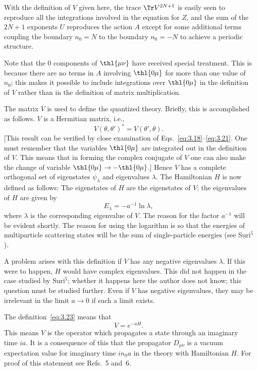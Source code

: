 With the definition of $V$ given here, the trace $\Tr V^{2N+1}$ is easily
seen to reproduce all the integrations involved in the equation for $Z$,
and the sum of the $2N+1$ exponents $U$ reproduces the action $A$ except
for some additional terms coupling the boundary $n_{0}=N$ to the
boundary $n_{0}=-N$ to achieve a periodic structure.

Note that the 0 components of $\thl{\mu\nu}$ have received special
treatment.  This is because there are no terms in $A$ involving
$\thl{0\mu}$ for more than one value of $n_{0}$; this makes it possible
to include integrations over $\thl{0\mu}$ in the definition of $V$
rather than in the definition of matrix multiplication.

The matrix $V$ is used to define the quantized theory.  Briefly, this is
accomplished as follows.  $V$ is a Hermitian matrix, i.e.,
\begin{equation}
V(\theta,\theta')^{*} = V(\theta',\theta).
\label{eq:3.22}
\end{equation}
[This result can be verified by close examination of
Eqs.~\eqref{eq:3.18}--\eqref{eq:3.21}.  One must remember that the
variables $\thl{0\mu}$ are integrated out in the definition of $V$.  This
means that in forming the complex conjugate of $V$ one can also make the
change of variable $\thl{0\mu} \to -\thl{0\mu}$.]  Hence $V$ has a
complete orthogonal set of eigenstates $\psi_{\lambda}$ and eigenvalues
$\lambda$.  The Hamiltonian $H$ is now defined as follows:  The
eigenstates of $H$ are the eigenstates of $V$; the eigenvalues of $H$ are
given by
\begin{equation}
E_{\lambda} = -a^{-1}\ln\lambda,
\label{eq:3.23}
\end{equation}
where $\lambda$ is the corresponding eigenvalue of $V$.  The reason for
the factor $a^{-1}$ will be evident shortly.  The reason for using the
logarithm is so that the energies of multiparticle scattering states will
be the sum of single-particle energies (see Suri${}^{5}$).

A problem arises with this definition if $V$ has any negative eigenvalues
$\lambda$.  If this were to happen, $H$ would have complex eigenvalues.
This did not happen in the case studied by Suri${}^{5}$; whether it
happens here the author does not know; this question must be studied
further.  Even if $V$ has negative eigenvalues, they may be irrelevant in
the limit $a\to0$ if such a limit exists.

The definition~\eqref{eq:3.23} means that
\begin{equation}
V = e^{-aH}.
\label{eq:3.24}
\end{equation}
This means $V$ is the operator which propagates a state through an
imaginary time $ia$.  It is a consequence of this that the propagator
$D_{\mu\nu}$ is a vacuum expectation value for imaginary time $in_{0}a$
in the theory with Hamiltonian $H$.  For proof of this statement see
Refs.~5 and~6.

